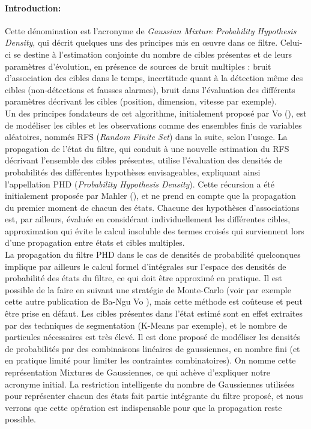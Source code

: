 \paragraph{Introduction:\\}
Cette dénomination est l'acronyme de \emph{Gaussian Mixture Probability Hypothesis Density}, qui décrit quelques uns des principes mis en œuvre dans ce filtre. Celui-ci se destine à l'estimation conjointe du nombre de cibles présentes et de leurs paramètres d'évolution, en présence de sources de bruit multiples : bruit d'association des cibles dans le temps, incertitude quant à la détection même des cibles (non-détections et fausses alarmes), bruit dans l'évaluation des différents paramètres décrivant les cibles (position, dimension, vitesse par exemple). \\

Un des principes fondateurs de cet algorithme, initialement proposé par Vo (\cite{Vo2006a}), est de modéliser les cibles et les observations comme des ensembles finis de variables aléatoires, nommés RFS (\emph{Random Finite Set}) dans la suite, selon l'usage. La propagation de l'état du filtre, qui conduit à une nouvelle estimation du RFS décrivant l'ensemble des cibles présentes, utilise l'évaluation des densités de probabilités des différentes hypothèses envisageables, expliquant ainsi l'appellation PHD (\emph{Probability Hypothesis Density}). Cette récursion a été initialement proposée par Mahler (\cite{Mahler2003}), et ne prend en compte que la propagation du premier moment de chacun des états. Chacune des hypothèses d'associations est, par ailleurs, évaluée en considérant individuellement les différentes cibles, approximation qui évite le calcul insoluble des termes croisés qui surviennent lors d'une propagation entre états et cibles multiples.\\

La propagation du filtre PHD dans le cas de densités de probabilité quelconques implique par ailleurs le calcul formel d'intégrales sur l'espace des densités de probabilité des états du filtre, ce qui doit être approximé en pratique. Il est possible de la faire en suivant une stratégie de Monte-Carlo (voir par exemple cette autre publication de Ba-Ngu Vo \cite{Vo2003}), mais cette méthode est coûteuse et peut être prise en défaut. Les cibles présentes dans l'état estimé sont en effet extraites par des techniques de segmentation (K-Means par exemple), et le nombre de particules nécessaires est très élevé. Il est donc proposé de modéliser les densités de probabilités par des combinaisons linéaires de gaussiennes, en nombre fini (et en pratique limité pour limiter les contraintes combinatoires). On nomme cette représentation \og Mixtures de Gaussiennes\fg{}, ce qui achève d'expliquer notre acronyme initial. La restriction intelligente du nombre de Gaussiennes utilisées pour représenter chacun des états fait partie intégrante du filtre proposé, et nous verrons que cette opération est indispensable pour que la propagation reste possible.\\

